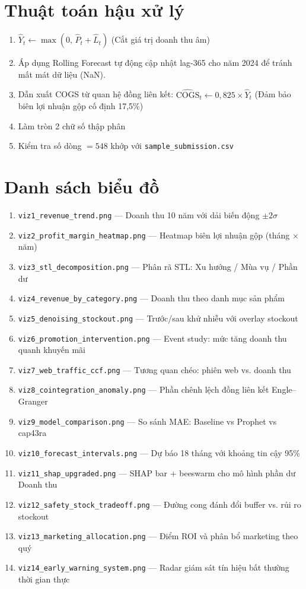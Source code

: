 \documentclass{article}
\begin{document}
\section{Thuật toán hậu xử lý}

\begin{enumerate}
  \item $\hat{Y}_t \leftarrow \max(0,\, \hat{P}_t + \hat{L}_t)$ \hfill (Cắt giá trị doanh thu âm)
  \item Áp dụng Rolling Forecast tự động cập nhật lag-365 cho năm 2024 để tránh mất mát dữ liệu (NaN).
  \item Dẫn xuất COGS từ quan hệ đồng liên kết: $\widehat{\text{COGS}}_t \leftarrow 0{,}825 \times \hat{Y}_t$ \hfill (Đảm bảo biên lợi nhuận gộp cố định 17,5\%)
  \item Làm tròn 2 chữ số thập phân
  \item Kiểm tra số dòng $= 548$ khớp với \texttt{sample\_submission.csv}
\end{enumerate}

\section{Danh sách biểu đồ}

\begin{enumerate}
  \item \texttt{viz1\_revenue\_trend.png} --- Doanh thu 10 năm với dải biến động $\pm2\sigma$
  \item \texttt{viz2\_profit\_margin\_heatmap.png} --- Heatmap biên lợi nhuận gộp (tháng $\times$ năm)
  \item \texttt{viz3\_stl\_decomposition.png} --- Phân rã STL: Xu hướng / Mùa vụ / Phần dư
  \item \texttt{viz4\_revenue\_by\_category.png} --- Doanh thu theo danh mục sản phẩm
  \item \texttt{viz5\_denoising\_stockout.png} --- Trước/sau khử nhiễu với overlay stockout
  \item \texttt{viz6\_promotion\_intervention.png} --- Event study: mức tăng doanh thu quanh khuyến mãi
  \item \texttt{viz7\_web\_traffic\_ccf.png} --- Tương quan chéo: phiên web vs. doanh thu
  \item \texttt{viz8\_cointegration\_anomaly.png} --- Phần chênh lệch đồng liên kết Engle--Granger
  \item \texttt{viz9\_model\_comparison.png} --- So sánh MAE: Baseline vs Prophet vs cap43ra
  \item \texttt{viz10\_forecast\_intervals.png} --- Dự báo 18 tháng với khoảng tin cậy 95\%
  \item \texttt{viz11\_shap\_upgraded.png} --- SHAP bar + beeswarm cho mô hình phần dư Doanh thu
  \item \texttt{viz12\_safety\_stock\_tradeoff.png} --- Đường cong đánh đổi buffer vs. rủi ro stockout
  \item \texttt{viz13\_marketing\_allocation.png} --- Điểm ROI và phân bổ marketing theo quý
  \item \texttt{viz14\_early\_warning\_system.png} --- Radar giám sát tín hiệu bất thường thời gian thực
\end{enumerate}
\end{document}
